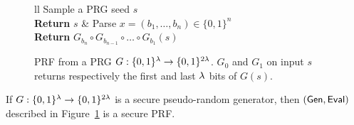 \begin{figure}[htb]
\centering
\begin{pcarray}{ll}
		{
			Sample a PRG seed $s$
				\\
			\textbf{Return} $s$
		}
		&
		{
			Parse $x = (b_1, \ldots, b_n) \in \{0,1\}^n$
				\\
			\textbf{Return} $G_{b_n} \circ G_{b_{n-1}} \circ \ldots \circ G_{b_1}(s)$
		}
\end{pcarray}
\caption{PRF from a PRG $G: \{0,1\}^\lambda \to \{0,1\}^{2\lambda}$. $G_0$ and $G_1$ on input $s$ returns respectively the first and last $\lambda$ bits of $G(s)$.}
\label{prot:GGM84:prf_from_prg}
\end{figure}

\begin{theorem}
	\label{theo:GGM84}
	If $G : \{0,1\}^\lambda \to \{0,1\}^{2\lambda}$ is a secure pseudo-random generator, then $(\mathsf{Gen}, \mathsf{Eval})$ described in Figure~\ref{prot:GGM84:prf_from_prg} is a secure PRF.
\end{theorem}
